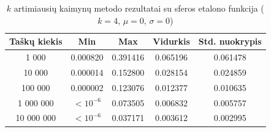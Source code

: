 \begin{table}[H]
    \centering
    \begin{tabular}{|c|c|c|c|c|}
        \hline
        \textbf{Taškų kiekis} & \textbf{Min} & \textbf{Max} & \textbf{Vidurkis} & \textbf{Std. nuokrypis} \\ \hline
        1 000        & 0.000820 & 0.391416 & 0.065196 & 0.061478 \\ \hline
        10 000       & 0.000014 & 0.152800 & 0.028154 & 0.024859 \\ \hline
        100 000      & 0.000002 & 0.123076 & 0.012377 & 0.010635 \\ \hline
        1 000 000    & $<10^{-6}$ & 0.073505 & 0.006832 & 0.005757 \\ \hline
        10 000 000   & $<10^{-6}$ & 0.037171 & 0.003612 & 0.002995 \\ \hline
    \end{tabular}
    \caption{$k$ artimiausių kaimynų metodo rezultatai su sferos etalono funkcija ($k = 4$, $\mu = 0$, $\sigma = 0$)}
\end{table}